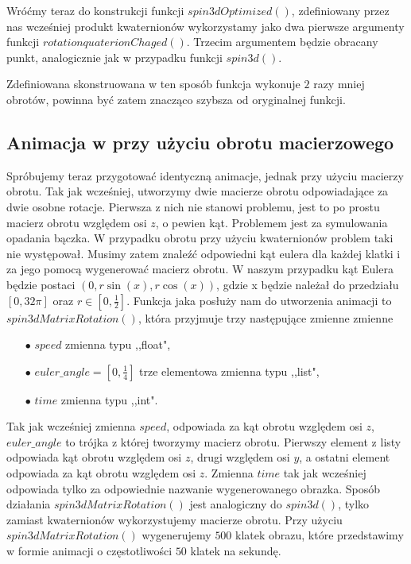 \documentclass[a4paper,twoside,11pt,reqno]{mwrep}
\theoremstyle{plain} \newtheorem{twr}{Twierdzenie}
\theoremstyle{plain} \newtheorem{lem}{Lemat}
\theoremstyle{definition} \newtheorem{defi}{Definicja}
\theoremstyle{remark} \newtheorem*{wni}{Wniosek}
\theoremstyle{definition} \newtheorem{uwaga}{Uwaga}
\theoremstyle{definition}\newtheorem{prz}{Przykład}
\begin{document}
Wróćmy teraz do konstrukcji funkcji $spin3dOptimized()$, 
zdefiniowany przez nas wcześniej produkt kwaternionów wykorzystamy jako dwa pierwsze argumenty
funkcji $rotationquaterionChaged()$. Trzecim argumentem będzie obracany punkt, analogicznie jak
w przypadku funkcji $spin3d()$.

Zdefiniowana skonstruowana w ten sposób funkcja wykonuje $2$ razy mniej obrotów,
powinna być zatem znacząco szybsza od oryginalnej funkcji.   
    
 	
\subsection{Animacja w przy użyciu obrotu macierzowego}
Spróbujemy teraz przygotować identyczną animacje, jednak przy użyciu macierzy obrotu.
Tak jak wcześniej, utworzymy dwie macierze obrotu odpowiadające za dwie osobne rotacje.
Pierwsza z nich nie stanowi problemu, jest to po prostu macierz obrotu względem osi $z$, 
o pewien kąt. Problemem jest za symulowania opadania bączka. W przypadku obrotu
przy użyciu kwaternionów problem taki nie występował. Musimy zatem znaleźć odpowiedni kąt eulera dla każdej klatki i za jego pomocą wygenerować macierz obrotu.  
W naszym przypadku kąt Eulera będzie postaci 
$(0,r\sin(x),r\cos(x))$, gdzie x będzie należał do przedziału $[0,32\pi]$ oraz 
$r \in \left[0,\frac{1}{2}\right]$. 
Funkcja jaka posłuży nam do utworzenia animacji to $spin3dMatrixRotation()$, która przyjmuje 
trzy następujące zmienne zmienne
\begin{itemize}
\item[$\bullet$] $speed$ zmienna typu ,,float",
\item[$\bullet$] $euler\_angle = \left[0,\frac{1}{4}\right]$ trze elementowa zmienna typu ,,list",
\item[$\bullet$] $time$ zmienna typu ,,int".
\end{itemize}
Tak jak wcześniej zmienna $speed$, odpowiada za kąt obrotu względem osi $z$, 
$euler\_angle$ to trójka z której tworzymy macierz obrotu. Pierwszy element z listy odpowiada
kąt obrotu względem osi $z$, drugi względem osi $y$, a ostatni element odpowiada za kąt obrotu
względem osi $z$.  Zmienna $time$ tak jak wcześniej odpowiada tylko za odpowiednie nazwanie 
wygenerowanego obrazka. Sposób działania $spin3dMatrixRotation()$ jest analogiczny do $spin3d()$,
tylko zamiast kwaternionów wykorzystujemy macierze obrotu.
Przy użyciu $spin3dMatrixRotation()$ wygenerujemy $500$ klatek obrazu, które
przedstawimy w formie animacji o częstotliwości $50$ klatek na sekundę.
\end{document}
